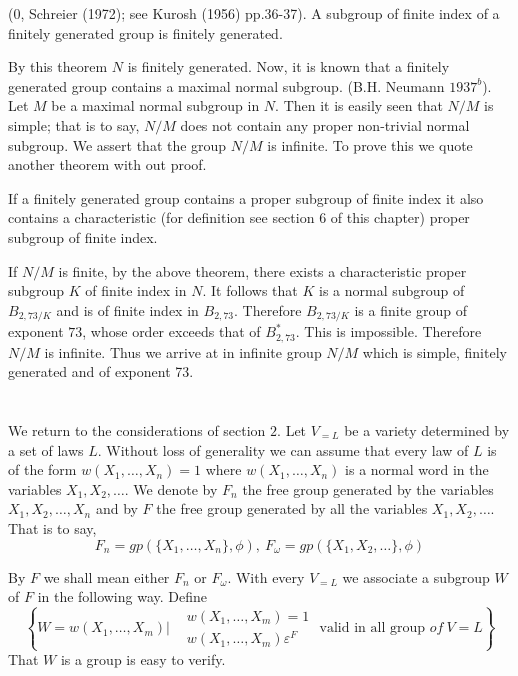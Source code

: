 \begin{theorem}
  (0, Schreier (1972); see Kurosh (1956) pp.36-37). A subgroup
  of finite index of a finitely generated group is finitely
  generated. 
\end{theorem}

By this theorem $N$ is finitely generated. Now, it is known that a
finitely generated group contains a maximal normal
subgroup. (B.H. Neumann $1937^b$). Let $M$ be a maximal normal
subgroup in $N$. 
Then it is easily seen that $N/M$ is simple; that is to say, $N/M$
does not contain any proper non-trivial normal subgroup. We assert
that the group $N/M$ is infinite. To prove this we quote another
theorem with out proof. 

\begin{theorem}[R. Baer $1953$]
  If a finitely generated group contains a proper subgroup of finite
  index it also contains a characteristic (for definition see section
  $6$ of this chapter) proper subgroup of finite index. 
\end{theorem}

If $N/M$ is finite, by the above theorem, there exists a
characteristic proper subgroup $K$ of finite index in $N$. It follows
that $K$ is a normal subgroup of $B_{2,73/K}$ and is of finite index
in $B_{2,73}$. Therefore $B_{2,73/K}$ is a finite group of exponent
$73$, whose order exceeds that of $B^*_{2,73}$. This is
impossible. Therefore $N/M$ is infinite. Thus we arrive at in infinite
group $N/M$ which is simple, finitely generated and of exponent 73. 

\section{}%

We return to the considerations of section $2$. Let $V_{=L}$ be a
variety determined by a set of laws $L$. Without loss of generality we
can assume that every law of $L$ is of the form $w(X_1,\ldots,X_n)=1$
where $w(X_1,\ldots,X_n)$ is a normal word in the variables $X_1,
X_2,\ldots$. We denote by $F_n$ the free group generated by the
variables $X_1, X_2, \ldots,X_n$ and by $F$ the free group generated
by all the variables $X_1, X_2,\ldots$. That is to say, 
$$
F_n =gp\left(\bigg \{X_1,\ldots, X_n \bigg \}, \phi\right),~F_\omega = gp
\left(\bigg\{X_1, X_2,\ldots \bigg\}, \phi\right) 
$$

By $F$ we shall mean either $F_n$ or $F_\omega$. With every $V_{=L}$
we associate a subgroup $W$ of $F$ in the following way. Define 
\begin{equation*}
  \left\{
  W=
  w(X_1,\ldots,X_m) \Bigg|
  \begin{aligned}
    & w(X_1,\ldots,X_m)=1 \\
    & w(X_1,\ldots,X_m) \varepsilon^F
  \end{aligned}
  \text{ valid in all group } of ~V=L
  \right\}
\end{equation*}
That $W$ is a group is easy to verify.

